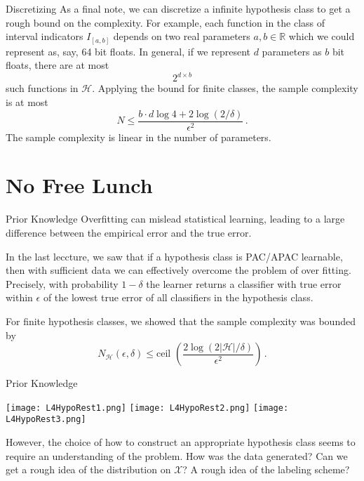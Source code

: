 \documentclass[10pt, table, dvipsnames,handout]{beamer}
\newcommand{\cH}{\ensuremath{\mathcal{H}}}
\newcommand{\bR}{\ensuremath{\mathbb{R}}}
\begin{document}
\begin{frame}[fragile]{Discretizing}
As a final note, we can discretize a infinite hypothesis class to get a rough bound on the complexity. \pause For example, each function in the class of interval indicators $I_{[a,b]}$ depends on two real parameters $a,b\in \bR$ which we could represent as, say, 64 bit floats. In general, if we represent $d$ parameters as $b$ bit floats, there are at most
$$
2^{d\times b}
$$
such functions in $\cH$. \pause Applying the bound for finite classes, the sample complexity is at most
$$
N\leq \frac{b\cdot d \log 4+2\log(2/\delta)}{\epsilon^2}\,.
$$
The sample complexity is linear in the number of parameters. 

\end{frame}







\section{No Free Lunch}

\begin{frame}[fragile]{Prior Knowledge}
Overfitting can mislead statistical learning, leading to a large difference between the empirical error and the true error. 

In the last leccture, we saw that if a hypothesis class is PAC/APAC learnable, then with sufficient data we can effectively overcome the problem of over fitting. Precisely, with probability $1-\delta$ the learner returns a classifier with true error within $\epsilon$ of the lowest true error of all classifiers in the hypothesis class. 

For finite hypothesis classes, we showed that the sample complexity was bounded by
$$
N_{\cH}(\epsilon,\delta)\leq \text{ceil }\left(\frac{2\log(2|\cH|/\delta)}{\epsilon^2}\right)\,.
$$
\end{frame}




\begin{frame}[fragile]{Prior Knowledge}
  \begin{minipage}[t][0.5\textheight][t]{\textwidth}
    \begin{overprint}
	   \centering \texttt{[image: L4HypoRest1.png]}
	  \onslide<2|handout:2> \centering \texttt{[image: L4HypoRest2.png]}
	  \onslide<3|handout:3> \centering \texttt{[image: L4HypoRest3.png]}
    \end{overprint}
  \end{minipage}
  \vfill
  \begin{minipage}[t][0.5\textheight][t]{\textwidth}
	However, the choice of how to construct an appropriate hypothesis class seems to require an understanding of the problem. How was the data generated? Can we get a rough idea of the distribution on $\mathcal{X}$? A rough idea of the labeling scheme?
  \end{minipage}


\end{frame}
\end{document}
